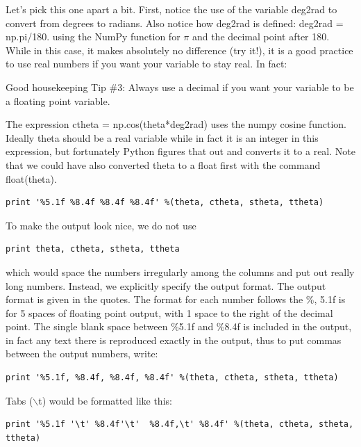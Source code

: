 \documentclass[11pt]{book}
\begin{document}
{{{ Let's pick this one apart a bit.  First, 
notice the use of the variable {\color{blue}deg2rad} to convert from degrees to radians.  Also notice how deg2rad is defined: {\color{blue}deg2rad = np.pi/180.} using the {\color{blue}NumPy} function for $\pi$ and the decimal point after 180.  While in this case, it makes absolutely no difference (try it!), it is a good practice to use real numbers if you want your variable to stay real.  In fact:

{\color{magenta}Good housekeeping Tip \#3:  Always use a decimal if you want your variable to be a floating point variable.}

The expression {\color{blue} ctheta = np.cos(theta*deg2rad)} uses the {\color{blue}numpy} cosine function. Ideally {\color{blue} theta} should be a real variable while in fact it is an integer
  in this expression, but fortunately Python figures that out and converts it to a real.   Note that we could have also converted theta to a float first with the command {\color{blue}float(theta)}.  
  
{ \color{blue} \begin{verbatim}  
print '%5.1f %8.4f %8.4f %8.4f' %(theta, ctheta, stheta, ttheta)   
\end{verbatim}}
  
\noindent To make the output look nice, we do not use

{ \color{blue} \begin{verbatim}  
print theta, ctheta, stheta, ttheta
\end{verbatim}}

\noindent which would space the numbers irregularly among the columns and put out really long numbers.  Instead,
we explicitly specify the output format.   The output format is given in the quotes.  The format for each
number follows the \%, 5.1f is for 5 spaces of floating point output, with 1
space to the right of the decimal point.  The single
blank space between \%5.1f and \%8.4f is included in the output, in fact any
text there is reproduced exactly in the output, thus to put commas between
the output numbers, write:

{ \color{blue} \begin{verbatim}  
print '%5.1f, %8.4f, %8.4f, %8.4f' %(theta, ctheta, stheta, ttheta)   
\end{verbatim}}

\noindent Tabs ($\backslash$t) would be formatted like this:      

{ \color{blue} \begin{verbatim}  
print '%5.1f '\t' %8.4f'\t'  %8.4f,\t' %8.4f' %(theta, ctheta, stheta, ttheta) 
\end{verbatim}  }  
  
}}}
\end{document}
